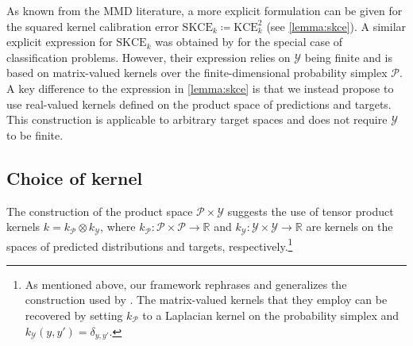 \documentclass{article}
\begin{document}
As known from the MMD literature, a more explicit formulation can be given for
the squared kernel calibration error $\mathrm{SKCE}_k \coloneqq \mathrm{KCE}^2_k$ (see \cref{lemma:skce}).
A similar explicit expression for $\mathrm{SKCE}_k$ was obtained by \citet{Widmann2019} for
the special case of classification problems. However, their expression relies on 
$\mathcal{Y}$ being finite and is based on matrix-valued kernels over the
finite-dimensional probability simplex $\mathcal{P}$. A key difference to the
expression in \cref{lemma:skce} is that we instead propose to use real-valued kernels defined
on the product space of predictions and targets. This construction is applicable to
arbitrary target spaces and does not require $\mathcal{Y}$ to be finite.

\subsection{Choice of kernel}
\label{sec:kernel_choice}

The construction of the product space $\mathcal{P} \times \mathcal{Y}$ suggests
the use of tensor product kernels $k = k_{\mathcal{P}} \otimes k_{\mathcal{Y}}$, where
$k_{\mathcal{P}} \colon \mathcal{P} \times \mathcal{P} \to \mathbb{R}$ and
$k_{\mathcal{Y}} \colon \mathcal{Y} \times \mathcal{Y} \to \mathbb{R}$ are
kernels on the spaces of predicted distributions and targets, respectively.\footnote{As
mentioned above, our framework rephrases and generalizes the construction used
by \citet{Widmann2019}. The matrix-valued kernels that they employ can be
recovered by setting $k_{\mathcal{P}}$ to a Laplacian kernel on the probability simplex and
$k_{\mathcal{Y}}(y, y') = \delta_{y,y'}$.}
\end{document}
